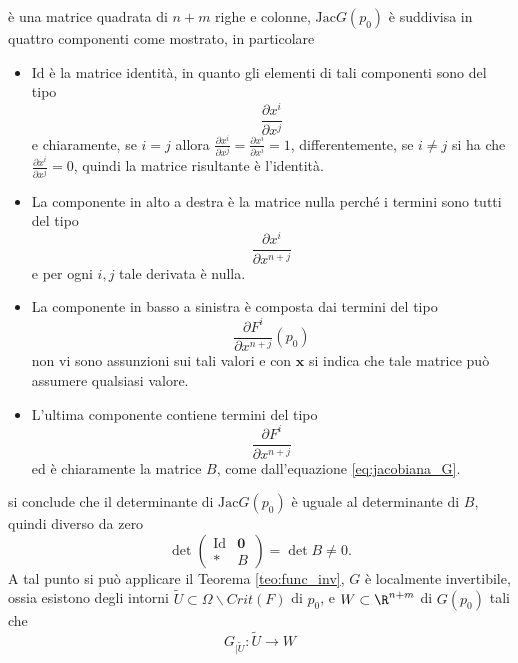 \documentclass[10pt, letterpaper]{report}
\begin{document}
è una matrice quadrata di $n+m$ righe e colonne, $\text{Jac}G(p_0)$ è suddivisa in quattro componenti come mostrato, in particolare\begin{itemize}
    \item $\text{Id}$ è la matrice identità, in quanto gli elementi di tali componenti sono del tipo \begin{equation}
        \frac{\partial x^i}{\partial x^j}
    \end{equation}
    e chiaramente, se $i=j$ allora $\frac{\partial x^i}{\partial x^j}=\frac{\partial x^i}{\partial x^i}=1$, differentemente, se $i\ne j$ si ha che $\frac{\partial x^i}{\partial x^j}=0$, quindi la matrice risultante è l'identità.
    \item La componente in alto a destra è la matrice nulla perché i termini sono tutti del tipo \begin{equation}
        \frac{\partial x^i}{\partial x^{n+j}}
    \end{equation}
    e per ogni $i,j$ tale derivata è nulla.
    \item La componente in basso a sinistra è composta dai termini del tipo 
    \begin{equation}
        \frac{\partial F^i}{\partial x^{n+j}}(p_0)
    \end{equation} 
    non vi sono assunzioni sui tali valori e con $\mathbf x$ si indica che tale matrice può assumere qualsiasi valore.
    \item L'ultima componente contiene termini del tipo\begin{equation}
        \frac{\partial F^i}{\partial x^{n+j}}
    \end{equation}
    ed è chiaramente la matrice $B$, come dall'equazione \eqref{eq:jacobiana_G}.
\end{itemize}
si conclude che il determinante di $\text{Jac}G(p_0)$ è uguale al determinante di $B$, quindi diverso da zero\begin{equation}
    \det\begin{pmatrix}
        \text{Id}&\mathbf 0 \\ \mathbf * & B
    \end{pmatrix}=\det B\ne 0.
\end{equation}
A tal punto si può applicare il Teorema \eqref{teo:func_inv}, $G$ è localmente invertibile, ossia esistono degli intorni $\tilde U\subset\Omega\backslash Crit(F)$ di $p_0$, e $W\subset\R^{n+m}$ di $G(p_0)$ tali che \begin{equation}
    G_{|\tilde U}:\tilde U \rightarrow W 
\end{equation}
\end{document}

